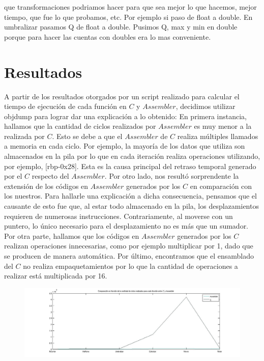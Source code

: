 \documentclass[10pt, a4paper]{article}
\begin{document}
que transformaciones podriamos hacer para que sea mejor lo que hacemos, mejor tiempo, que fue lo que probamos, etc. Por ejemplo si paso de float a double. En umbralizar pasamos Q de float a double. Pusimos Q, max y min en double porque para hacer las cuentas con doubles era lo mas conveniente.
\newline
\section{Resultados}

A partir de los resultados otorgados por un script realizado para calcular el tiempo de ejecución de cada función en $C$ y $Assembler$, decidimos utilizar objdump para lograr dar una explicación a lo obtenido:\newline
En primera instancia, hallamos que la cantidad de ciclos realizados por $Assembler$ es muy menor a la realizada por $C$. Esto se debe a que el $Assembler$ de $C$ realiza múltiples llamados a memoria en cada ciclo. Por ejemplo, la mayoría de los datos que utiliza son almacenados en la pila por lo que en cada iteración realiza operaciones utilizando, por ejemplo, [rbp-0x28]. Esta es la causa principal del retraso temporal generado por el $C$ respecto del $Assembler$. \newline 
Por otro lado, nos resultó sorprendente la extensión de los códigos en $Assembler$ generados por los $C$ en comparación con los nuestros. Para hallarle una explicación a dicha consecuencia, pensamos que el causante de esto fue que, al estar todo almacenado en la pila, los desplazamientos requieren de numerosas instrucciones. Contrariamente, al moverse con un puntero, lo único necesario para el desplazamiento no es más que un sumador. \newline
Por otra parte, hallamos que los códigos en $Assembler$ generados por los $C$ realizan operaciones innecesarias, como por ejemplo multiplicar por 1, dado que se producen de manera automática.\newline
Por último, encontramos que el ensamblado del $C$ no realiza empaquetamientos por lo que la cantidad de operaciones a realizar está multiplicada por 16.\newline
\begin{figure}[H] %
\begin{center}
\includegraphics[width=520pt]{./velocidad.jpg}
\end{center}
\end{figure}
\end{document}
